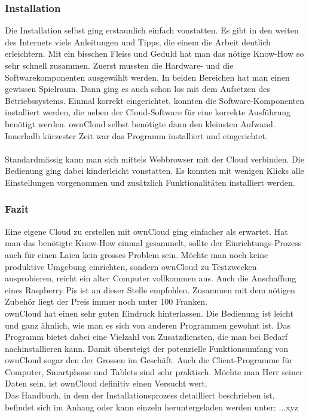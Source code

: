 \subsubsection{Installation}
Die Installation selbst ging erstaunlich einfach vonstatten. Es gibt in den weiten des Internets viele Anleitungen und Tipps, die einem die Arbeit deutlich erleichtern. Mit ein bisschen Fleiss und Geduld hat man das nötige Know-How so sehr schnell zusammen. Zuerst mussten die Hardware- und die Softwarekomponenten ausgewählt werden. In beiden Bereichen hat man einen gewissen Spielraum. Dann ging es auch schon los mit dem Aufsetzen des Betriebssystems. Einmal korrekt eingerichtet, konnten die Software-Komponenten installiert werden, die neben der Cloud-Software für eine korrekte Ausführung benötigt werden. ownCloud selbst benötigte dann den kleinsten Aufwand. Innerhalb kürzester Zeit war das Programm installiert und eingerichtet.
\\
\\
Standardmässig kann man sich mittels Webbrowser mit der Cloud verbinden. Die Bedienung ging dabei kinderleicht vonstatten. Es konnten mit wenigen Klicks alle Einstellungen vorgenommen und zusätzlich Funktionalitäten installiert werden.

\subsubsection{Fazit}
Eine eigene Cloud zu erstellen mit ownCloud ging einfacher als erwartet. Hat man das benötigte Know-How einmal gesammelt, sollte der Einrichtungs-Prozess auch für einen Laien kein grosses Problem sein. Möchte man noch keine produktive Umgebung einrichten, sondern ownCloud zu Testzwecken ausprobieren, reicht ein alter Computer vollkommen aus. Auch die Anschaffung eines Raspberry Pis ist an dieser Stelle empfohlen. Zusammen mit dem nötigen Zubehör liegt der Preis immer noch unter 100 Franken.
\\
ownCloud hat einen sehr guten Eindruck hinterlassen. Die Bedienung ist leicht und ganz ähnlich, wie man es sich von anderen Programmen gewohnt ist. Das Programm bietet dabei eine Vielzahl von Zusatzdiensten, die man bei Bedarf nachinstallieren kann. Damit übersteigt der potenzielle Funktionsumfang von ownCloud sogar den der Grossen im Geschäft. Auch die Client-Programme für Computer, Smartphone und Tablets sind sehr praktisch.
Möchte man Herr seiner Daten sein, ist ownCloud definitiv einen Versucht wert.
\\
Das Handbuch, in dem der Installationsprozess detailliert beschrieben ist, befindet sich im Anhang oder kann einzeln heruntergeladen werden unter: ...xyz

